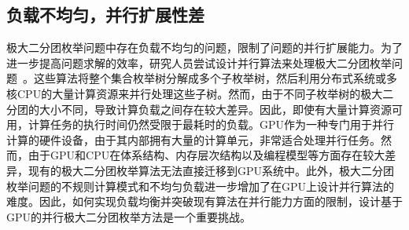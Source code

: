 \subsection{负载不均匀，并行扩展性差}

极大二分团枚举问题中存在负载不均匀的问题，限制了问题的并行扩展能力。为了进一步提高问题求解的效率，研究人员尝试设计并行算法来处理极大二分团枚举问题~\cite{mapreduceMBE16, MBEHe18, parMBE18}。这些算法将整个集合枚举树分解成多个子枚举树，然后利用分布式系统或多核CPU的大量计算资源来并行处理这些子树。然而，由于不同子枚举树的极大二分团的大小不同，导致计算负载之间存在较大差异。因此，即使有大量计算资源可用，计算任务的执行时间仍然受限于最耗时的负载。GPU作为一种专门用于并行计算的硬件设备，由于其内部拥有大量的计算单元，非常适合处理并行任务。然而，由于GPU和CPU在体系结构、内存层次结构以及编程模型等方面存在较大差异，现有的极大二分团枚举算法无法直接迁移到GPU系统中。此外，极大二分团枚举问题的不规则计算模式和不均匀负载进一步增加了在GPU上设计并行算法的难度。因此，如何实现负载均衡并突破现有算法在并行能力方面的限制，设计基于GPU的并行极大二分团枚举方法是一个重要挑战。


